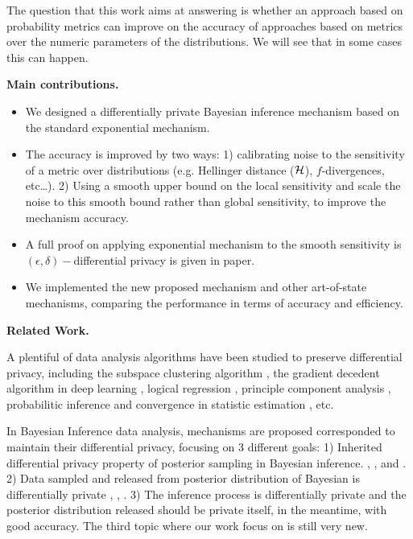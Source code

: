 \documentclass{article}
\begin{document}
The question that this work aims at answering is whether
an approach based on probability metrics can improve on the accuracy of approaches based on metrics over
the numeric parameters of the distributions. 
We will see that in some cases this can happen.

\noindent \textbf{Main contributions.}
\begin{itemize}
	\item We designed a differentially private Bayesian inference mechanism based on the standard exponential mechanism.

	\item The accuracy is improved by two ways: 1) calibrating noise to the sensitivity of a metric over distributions (e.g. Hellinger distance ($\mathcal{H}$), $f$-divergences, etc\dots). 2) Using a smooth upper bound on the local sensitivity and scale the noise to this smooth bound rather than global sensitivity, to improve the mechanism accuracy.

  \item A full proof on applying exponential mechanism to the smooth sensitivity is $(\epsilon, \delta)-$differential privacy is given in paper.

	\item We implemented the new proposed mechanism and other art-of-state mechanisms, comparing the performance in terms of accuracy and efficiency.
\end{itemize}


\noindent \textbf{Related Work.}

A plentiful of data analysis algorithms have been studied to preserve differential privacy, including the subspace clustering algorithm \cite{wang2015differentially}, the gradient decedent algorithm in deep learning \cite{abadi2016deep}, logical regression \cite{chaudhuri2009privacy}, principle component analysis \cite{chaudhuri2012near}, probabilitic inference \cite{williams2010probabilistic} and convergence in statistic estimation \cite{chaudhuri2012convergence}, etc. 

In Bayesian Inference data analysis, mechanisms are proposed corresponded to maintain their differential privacy, focusing on 3 different goals: 1) Inherited differential privacy property of posterior sampling in Bayesian inference. \cite{dimitrakakis2014robust}, \cite{zhang2016differential}, \cite{zheng2015differential} and \cite{wang2015privacy}. 2) Data sampled and released from posterior distribution of Bayesian is differentially private \cite{Zhang2017privbayes}, \cite{dimitrakakis2015differential},  \cite{foulds2016theory}. 3) The inference process is differentially private and the posterior distribution released should be private itself, in the meantime, with good accuracy. The third topic where our work focus on is still very new.
\end{document}
